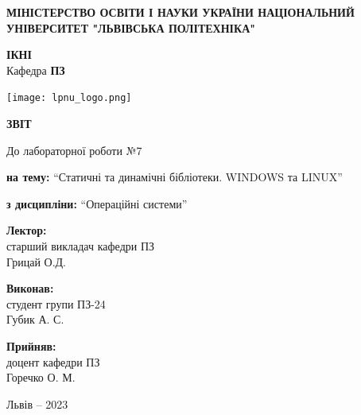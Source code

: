 \documentclass[12pt]{extarticle}
\begin{document}
\begin{titlepage}
    \begin{center}
        \textbf{\normalsize{\MakeUppercase{
            Міністерство Освіти і науки України
            Національний університет "Львівська політехніка"
        }}}

        \begin{flushright}
        \textbf{ІКНІ}\\
        Кафедра \textbf{ПЗ}
        \end{flushright}
        \vspace{15mm}

        \texttt{[image: lpnu\_logo.png]}

        \vspace*{\fill}

        \textbf{\normalsize{\MakeUppercase{Звіт}}}
            
        До лабораторної роботи №7

        \textbf{на тему:} “Статичні та динамічні бібліотеки. WINDOWS та LINUX”

        \textbf{з дисципліни:} “Операційні системи”
            
        \vspace*{\fill}

        \begin{flushright}

            \textbf{Лектор:}\\
            старший викладач кафедри ПЗ\\
            Грицай О.Д.\\
            \vspace{12pt}

            \textbf{Виконав:}\\
            студент групи ПЗ-24\\
            Губик А. С.\\
            \vspace{12pt}

            \textbf{Прийняв:}\\
            доцент кафедри ПЗ\\
            Горечко О. М.\\
        \vspace{12pt}
        \end{flushright}

        Львів -- 2023
            
            
    \end{center}
\end{titlepage}
\end{document}
